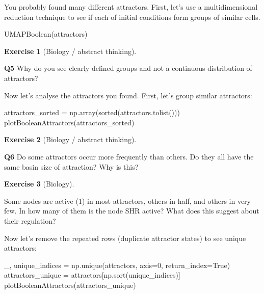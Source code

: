 \documentclass[
  letterpaper,
  DIV=11,
  numbers=noendperiod]{scrreprt}
\newenvironment{Shaded}{\begin{snugshade}}{\end{snugshade}}
\newcommand{\BuiltInTok}[1]{\textcolor[rgb]{0.00,0.23,0.31}{#1}}
\newcommand{\DecValTok}[1]{\textcolor[rgb]{0.68,0.00,0.00}{#1}}
\newcommand{\NormalTok}[1]{\textcolor[rgb]{0.00,0.23,0.31}{#1}}
\newcommand{\OperatorTok}[1]{\textcolor[rgb]{0.37,0.37,0.37}{#1}}
\newcommand{\VariableTok}[1]{\textcolor[rgb]{0.07,0.07,0.07}{#1}}
\theoremstyle{definition}
\newtheorem{exercise}{Exercise}[chapter]
\theoremstyle{remark}
\begin{document}
You probably found many different attractors. First, let's use a
multidimensional reduction technique to see if each of initial
conditions form groups of similar cells.

\begin{Shaded}
\begin{Highlighting}[]
\NormalTok{UMAPBoolean(attractors)}
\end{Highlighting}
\end{Shaded}

\begin{exercise}[Biology / abstract
thinking]\protect\hypertarget{exr-non}{}\label{exr-non}

\textbf{Q5} Why do you see clearly defined groups and not a continuous
distribution of attractors?

\end{exercise}

Now let's analyse the attractors you found. First, let's group similar
attractors:

\begin{Shaded}
\begin{Highlighting}[]
\NormalTok{attractors\_sorted }\OperatorTok{=}\NormalTok{ np.array(}\BuiltInTok{sorted}\NormalTok{(attractors.tolist()))}
\NormalTok{plotBooleanAttractors(attractors\_sorted) }
\end{Highlighting}
\end{Shaded}

\begin{exercise}[Biology / abstract
thinking]\protect\hypertarget{exr-non}{}\label{exr-non}

\textbf{Q6} Do some attractors occur more frequently than others. Do
they all have the same basin size of attraction? Why is this?

\end{exercise}

\begin{exercise}[Biology]\protect\hypertarget{exr-non}{}\label{exr-non}

Some nodes are active (1) in most attractors, others in half, and others
in very few. In how many of them is the node SHR active? What does this
suggest about their regulation?

\end{exercise}

Now let's remove the repeated rows (duplicate attractor states) to see
unique attractors:

\begin{Shaded}
\begin{Highlighting}[]
\NormalTok{\_, unique\_indices }\OperatorTok{=}\NormalTok{ np.unique(attractors, axis}\OperatorTok{=}\DecValTok{0}\NormalTok{, return\_index}\OperatorTok{=}\VariableTok{True}\NormalTok{)}
\NormalTok{attractors\_unique }\OperatorTok{=}\NormalTok{ attractors[np.sort(unique\_indices)]}
\NormalTok{plotBooleanAttractors(attractors\_unique) }
\end{Highlighting}
\end{Shaded}
\end{document}
